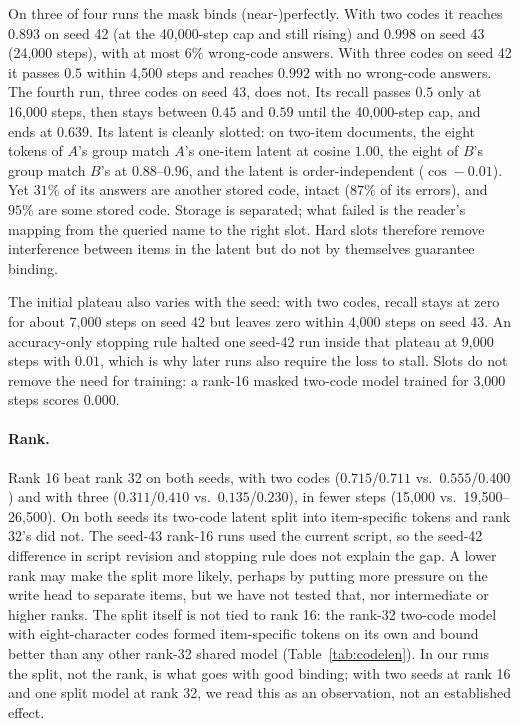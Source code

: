 On three of four runs the mask binds (near-)perfectly. With two codes it reaches $0.893$ on seed 42 (at the 40{,}000-step cap and still rising) and $0.998$ on seed 43 (24{,}000 steps), with at most $6\%$ wrong-code answers. With three codes on seed 42 it passes $0.5$ within 4{,}500 steps and reaches $0.992$ with no wrong-code answers. The fourth run, three codes on seed 43, does not. Its recall passes $0.5$ only at 16{,}000 steps, then stays between $0.45$ and $0.59$ until the 40{,}000-step cap, and ends at $0.639$. Its latent is cleanly slotted: on two-item documents, the eight tokens of $A$'s group match $A$'s one-item latent at cosine $1.00$, the eight of $B$'s group match $B$'s at $0.88$--$0.96$, and the latent is order-independent ($\cos -0.01$). Yet $31\%$ of its answers are another stored code, intact ($87\%$ of its errors), and $95\%$ are some stored code. Storage is separated; what failed is the reader's mapping from the queried name to the right slot. Hard slots therefore remove interference between items in the latent but do not by themselves guarantee binding.

The initial plateau also varies with the seed: with two codes, recall stays at zero for about 7{,}000 steps on seed 42 but leaves zero within 4{,}000 steps on seed 43. An accuracy-only stopping rule halted one seed-42 run inside that plateau at 9{,}000 steps with $0.01$, which is why later runs also require the loss to stall. Slots do not remove the need for training: a rank-16 masked two-code model trained for 3{,}000 steps scores $0.000$.

\paragraph{Rank.} Rank 16 beat rank 32 on both seeds, with two codes ($0.715$/$0.711$ vs.\ $0.555$/$0.400$) and with three ($0.311$/$0.410$ vs.\ $0.135$/$0.230$), in fewer steps (15{,}000 vs.\ 19{,}500--26{,}500). On both seeds its two-code latent split into item-specific tokens and rank 32's did not. The seed-43 rank-16 runs used the current script, so the seed-42 difference in script revision and stopping rule does not explain the gap. A lower rank may make the split more likely, perhaps by putting more pressure on the write head to separate items, but we have not tested that, nor intermediate or higher ranks. The split itself is not tied to rank 16: the rank-32 two-code model with eight-character codes formed item-specific tokens on its own and bound better than any other rank-32 shared model (Table~\ref{tab:codelen}). In our runs the split, not the rank, is what goes with good binding; with two seeds at rank 16 and one split model at rank 32, we read this as an observation, not an established effect.

